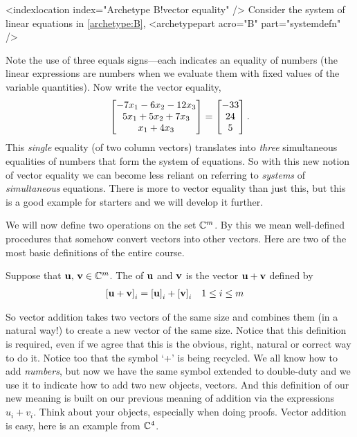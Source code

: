 \documentclass{ximera}
\begin{document}
\begin{example}

<indexlocation index="Archetype B!vector equality" />
Consider the system of linear equations in \ref{archetype:B},
<archetypepart acro="B" part="systemdefn" />


Note the use of three equals signs---each indicates an equality of numbers (the linear expressions are numbers when we evaluate them with fixed values of the variable quantities).  Now write the vector equality,
\[
\begin{bmatrix}-7x_1 -6 x_2 - 12x_3\\ 5x_1  + 5x_2 + 7x_3\\ x_1 +4x_3\end{bmatrix}
=
\begin{bmatrix}-33\\24\\5\end{bmatrix}.
\]
This \textit{single} equality (of two column vectors) translates into
\textit{three} simultaneous equalities of numbers that form the system
of equations.  So with this new notion of vector equality we can
become less reliant on referring to \textit{systems} of
\textit{simultaneous} equations.  There is more to vector equality
than just this, but this is a good example for starters and we will
develop it further.
\end{example}

We will now define two operations on the set $\mathbb{C}^{m}$.  By this
we mean well-defined procedures that somehow convert vectors into
other vectors.  Here are two of the most basic definitions of the
entire course.

\begin{definition}
  Suppose that $\mathbf{u},\,\mathbf{v}\in\mathbb{C}^{m}$. The  of
  $\mathbf{u}$ and $\mathbf{v}$ is the vector $\mathbf{u}+\mathbf{v}$ defined
  by
  \begin{align*}
    \left\lbrack\mathbf{u}+\mathbf{v}\right\rbrack_{i}
    &=\left\lbrack\mathbf{u}\right\rbrack_{i}+\left\lbrack\mathbf{v}\right\rbrack_{i}
    &&1\leq i\leq m
  \end{align*}
\end{definition}

So vector addition takes two vectors of the same size and combines
them (in a natural way!) to create a new vector of the same size.
Notice that this definition is required, even if we agree that this is
the obvious, right, natural or correct way to do it.  Notice too that
the symbol `+' is being recycled.  We all know how to add
\textit{numbers}, but now we have the same symbol extended to
double-duty and we use it to indicate how to add two new objects,
vectors.  And this definition of our new meaning is built on our
previous meaning of addition via the expressions $u_i+v_i$.  Think
about your objects, especially when doing proofs.  Vector addition is
easy, here is an example from $\mathbb{C}^{4}$.
\end{document}
